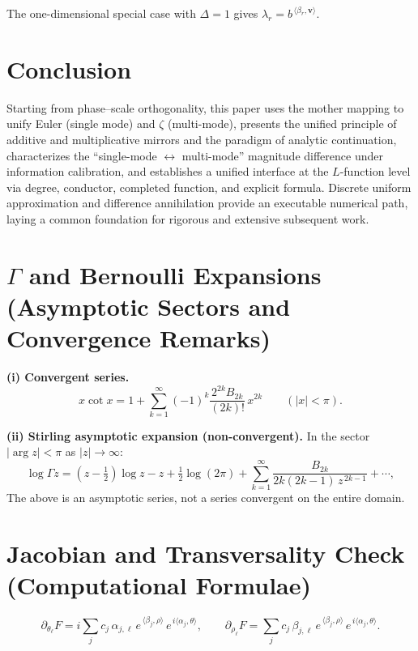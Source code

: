 \documentclass[11pt,a4paper]{article}
\theoremstyle{remark}
\begin{document}
The one-dimensional special case with $\Delta=1$ gives $\lambda_r=b^{\,\langle\beta_r,\mathbf v\rangle}$.

\section{Conclusion}

Starting from phase--scale orthogonality, this paper uses the mother mapping to unify Euler (single mode) and $\zeta$ (multi-mode), presents the unified principle of additive and multiplicative mirrors and the paradigm of analytic continuation, characterizes the ``single-mode $\leftrightarrow$ multi-mode'' magnitude difference under information calibration, and establishes a unified interface at the $L$-function level via degree, conductor, completed function, and explicit formula. Discrete uniform approximation and difference annihilation provide an executable numerical path, laying a common foundation for rigorous and extensive subsequent work.

\appendix

\section{$\Gamma$ and Bernoulli Expansions (Asymptotic Sectors and Convergence Remarks)}

\textbf{(i) Convergent series.}
\begin{equation}
x\cot x
=1+\sum_{k=1}^{\infty}(-1)^{k}\frac{2^{2k}B_{2k}}{(2k)!}\,x^{2k}\qquad(|x|<\pi).
\end{equation}

\textbf{(ii) Stirling asymptotic expansion (non-convergent).} In the sector $|\arg z|<\pi$ as $|z|\to\infty$:
\begin{equation}
\log\Gamma z=(z-\tfrac12)\log z-z+\tfrac12\log(2\pi)
+\sum_{k=1}^{\infty}\frac{B_{2k}}{2k(2k-1)\,z^{\,2k-1}}+\cdots ,
\end{equation}
The above is an asymptotic series, not a series convergent on the entire domain.

\section{Jacobian and Transversality Check (Computational Formulae)}

\begin{equation}
\partial_{\theta_\ell}F
=i\sum_j c_j\,\alpha_{j,\ell}\,e^{\,\langle\beta_j,\rho\rangle}\,e^{\,i\langle\alpha_j,\theta\rangle},\qquad
\partial_{\rho_\ell}F
=\sum_j c_j\,\beta_{j,\ell}\,e^{\,\langle\beta_j,\rho\rangle}\,e^{\,i\langle\alpha_j,\theta\rangle}.
\end{equation}
\end{document}
